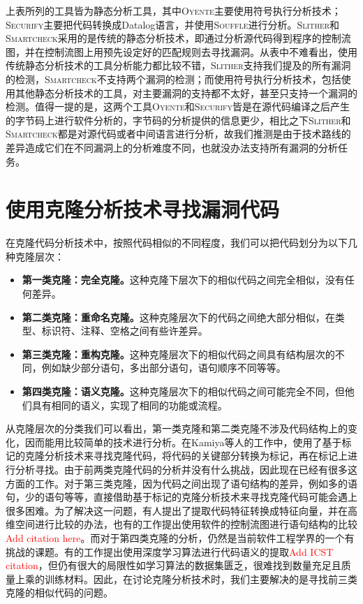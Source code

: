 上表所列的工具皆为静态分析工具，其中\textsc{Oyente}主要使用符号执行分析技术；\textsc{Securify}主要把代码转换成Datalog语言，并使用\textsc{Souffle}进行分析。\textsc{Slither}和\textsc{Smartcheck}采用的是传统的静态分析技术，即通过分析源代码得到程序的控制流图，并在控制流图上用预先设定好的匹配规则去寻找漏洞。从表中不难看出，使用传统静态分析技术的工具分析能力都比较不错，\textsc{Slither}支持我们提及的所有漏洞的检测，\textsc{Smartcheck}不支持两个漏洞的检测；而使用符号执行分析技术，包括使用其他静态分析技术的工具，对主要漏洞的支持都不太好，甚至只支持一个漏洞的检测。值得一提的是，这两个工具\textsc{Oyente}和\textsc{Securify}皆是在源代码编译之后产生的字节码上进行软件分析的，字节码的分析提供的信息更少，相比之下\textsc{Slither}和\textsc{Smartcheck}都是对源代码或者中间语言进行分析，故我们推测是由于技术路线的差异造成它们在不同漏洞上的分析难度不同，也就没办法支持所有漏洞的分析任务。

\section{使用克隆分析技术寻找漏洞代码}

在克隆代码分析技术中，按照代码相似的不同程度，我们可以把代码划分为以下几种克隆层次：
\begin{itemize}
  \item \textbf{第一类克隆：完全克隆。}这种克隆下层次下的相似代码之间完全相似，没有任何差异。
  \item \textbf{第二类克隆：重命名克隆。}这种克隆层次下的代码之间绝大部分相似，在类型、标识符、注释、空格之间有些许差异。
  \item \textbf{第三类克隆：重构克隆。}这种克隆层次下的相似代码之间具有结构层次的不同，例如缺少部分语句，多出部分语句，语句顺序不同等等。
  \item \textbf{第四类克隆：语义克隆。}这种克隆层次下的相似代码之间可能完全不同，但他们具有相同的语义，实现了相同的功能或流程。
\end{itemize}
从克隆层次的分类我们可以看出，第一类克隆和第二类克隆不涉及代码结构上的变化，因而能用比较简单的技术进行分析。在Kamiya等人的工作中\cite{ccfinder}，使用了基于标记的克隆分析技术来寻找克隆代码，将代码的关键部分转换为标记，再在标记上进行分析寻找。由于前两类克隆代码的分析并没有什么挑战，因此现在已经有很多这方面的工作。对于第三类克隆，因为代码之间出现了语句结构的差异，例如多的语句，少的语句等等，直接借助基于标记的克隆分析技术来寻找克隆代码可能会遇上很多困难。为了解决这一问题，有人提出了提取代码特征转换成特征向量，并在高维空间进行比较的办法\cite{deckard}，也有的工作提出使用软件的控制流图进行语句结构的比较\textcolor{red}{Add citation here}。而对于第四类克隆的分析，仍然是当前软件工程学界的一个有挑战的课题。有的工作提出使用深度学习算法进行代码语义的提取\textcolor{red}{Add ICST citation}，但仍有很大的局限性如学习算法的数据集匮乏，很难找到数量充足且质量上乘的训练材料。因此，在讨论克隆分析技术时，我们主要解决的是寻找前三类克隆的相似代码的问题。

